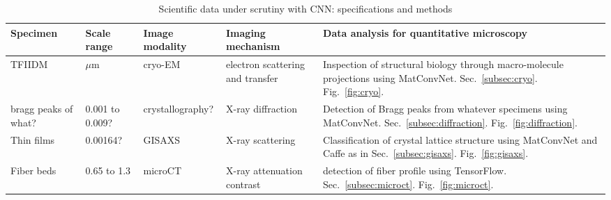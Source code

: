 
\begin{table*}[!]
\centering
\caption{Scientific data under scrutiny with CNN: specifications and methods}
\label{table1}
\begin{tabular}{p{2cm}p{1.6cm}p{1.6cm}p{3cm}p{7.5cm}}
\hline
\rowcolor[HTML]{CCE5FF}
Specimen  &  Scale range  &  Image \newline modality  &  Imaging  \newline mechanism  &  Data analysis for quantitative microscopy
\\
\hline
\rowcolor[HTML]{FFFFFF} %
TFIIDM & $\mu$m & cryo-EM & electron scattering and transfer & Inspection of structural biology through macro-molecule projections using MatConvNet. Sec.~\ref{subsec:cryo}. Fig.~\ref{fig:cryo}.
\\
\hline
\rowcolor[HTML]{F6F6F4} %
bragg peaks of what? & 0.001 to 0.009?  & crystallography? & X-ray diffraction  & Detection of Bragg peaks from whatever specimens using MatConvNet. Sec.~\ref{subsec:diffraction}. Fig.~\ref{fig:diffraction}.
\\
\hline
\rowcolor[HTML]{FFFFFF} %
Thin films   & 0.00164?  & GISAXS  & X-ray scattering & Classification of crystal lattice structure using MatConvNet and Caffe as in Sec.~\ref{subsec:gisaxs}. Fig.~\ref{fig:gisaxs}.
\\
\hline
\rowcolor[HTML]{F6F6F4} %
Fiber beds & 0.65 to 1.3 & microCT  & X-ray attenuation contrast & detection of fiber profile using TensorFlow. Sec.~\ref{subsec:microct}. Fig.~\ref{fig:microct}.
\\
\hline
\end{tabular}
\end{table*}
